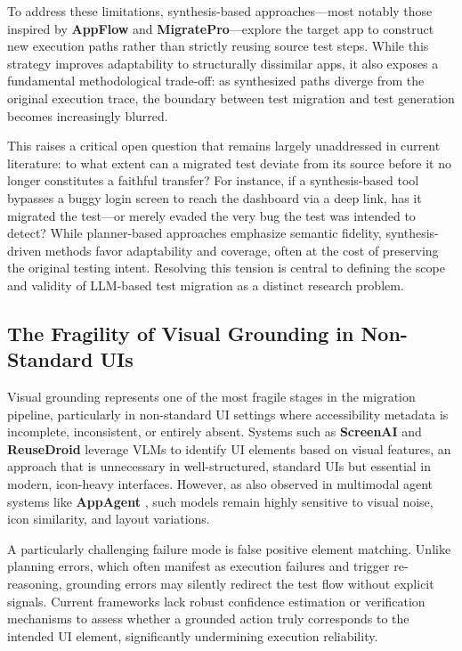 \documentclass[acmsmall,nonacm]{acmart}
\begin{document}
To address these limitations, synthesis-based approaches—most notably those inspired by \textbf{AppFlow} \cite{10.1145/3236024.3236055} and \textbf{MigratePro}—explore the target app to construct new execution paths rather than strictly reusing source test steps. While this strategy improves adaptability to structurally dissimilar apps, it also exposes a fundamental methodological trade-off: as synthesized paths diverge from the original execution trace, the boundary between test migration and test generation becomes increasingly blurred.

This raises a critical open question that remains largely unaddressed in current literature: to what extent can a migrated test deviate from its source before it no longer constitutes a faithful transfer? For instance, if a synthesis-based tool bypasses a buggy login screen to reach the dashboard via a deep link, has it migrated the test—or merely evaded the very bug the test was intended to detect? While planner-based approaches emphasize semantic fidelity, synthesis-driven methods favor adaptability and coverage, often at the cost of preserving the original testing intent. Resolving this tension is central to defining the scope and validity of LLM-based test migration as a distinct research problem.

\subsection{The Fragility of Visual Grounding in Non-Standard UIs}
Visual grounding represents one of the most fragile stages in the migration pipeline, particularly in non-standard UI settings where accessibility metadata is incomplete, inconsistent, or entirely absent. Systems such as \textbf{ScreenAI} \cite{baechler2024screenaivisionlanguagemodelui} and \textbf{ReuseDroid} \cite{li2025reusedroidvlmempoweredandroidui} leverage VLMs to identify UI elements based on visual features, an approach that is unnecessary in well-structured, standard UIs but essential in modern, icon-heavy interfaces. However, as also observed in multimodal agent systems like \textbf{AppAgent} \cite{10.1145/3706598.3713600}, such models remain highly sensitive to visual noise, icon similarity, and layout variations.

A particularly challenging failure mode is false positive element matching. Unlike planning errors, which often manifest as execution failures and trigger re-reasoning, grounding errors may silently redirect the test flow without explicit signals. Current frameworks lack robust confidence estimation or verification mechanisms to assess whether a grounded action truly corresponds to the intended UI element, significantly undermining execution reliability.
\end{document}
